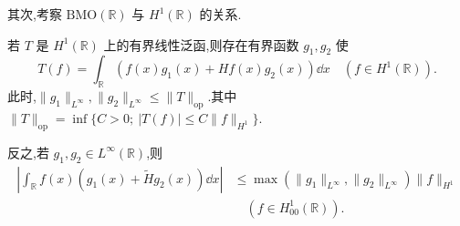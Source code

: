 其次,考察 $\mathrm{BMO}(\mathbb{R})$ 与 $H^{1}(\mathbb{R})$ 的关系.

\begin{theorem}\label{thm:1.13.5}
若 $T$ 是 $H^{1}(\mathbb{R})$ 上的有界线性泛函,则存在有界函数 $g_{1}, g_{2}$ 使
\begin{equation*}
T(f) = \int_{\mathbb{R}}\left(f(x)g_{1}(x) + Hf(x)g_{2}(x)\right)\dd x \quad (f \in H^{1}(\mathbb{R})).
\end{equation*}
此时,$\| g_{1} \|_{L^{\infty}}, \| g_{2} \|_{L^{\infty}} \leq \| T \|_{\mathrm{op}}$.其中 $\| T \|_{\mathrm{op}} = \inf\{C > 0;\ |T(f)| \leq C\| f \|_{H^{1}}\}$.

反之,若 $g_{1}, g_{2} \in L^{\infty}(\mathbb{R})$,则
\begin{align*}
\left|\displaystyle\int_{\mathbb{R}}f(x)\left(g_{1}(x) + \tilde{H}g_{2}(x)\right)\dd x\right| & \leq \max\left(\| g_{1} \|_{L^{\infty}}, \| g_{2} \|_{L^{\infty}}\right)\| f \|_{H^{1}} \\
& \quad (f \in H_{00}^{1}(\mathbb{R})).
\end{align*}
\end{theorem}

